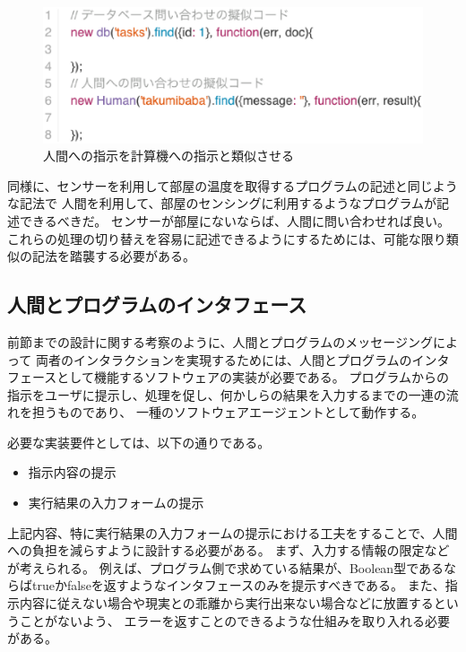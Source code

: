 \begin{figure}[htbp]
  \begin{center}
  \includegraphics[width=.9\linewidth]{images/design_integrated_style.js.eps}
  \end{center}
  \caption{人間への指示を計算機への指示と類似させる}
  \label{fig:design_integrated_style}
\end{figure}

同様に、センサーを利用して部屋の温度を取得するプログラムの記述と同じような記法で
人間を利用して、部屋のセンシングに利用するようなプログラムが記述できるべきだ。
センサーが部屋にないならば、人間に問い合わせれば良い。
これらの処理の切り替えを容易に記述できるようにするためには、可能な限り類似の記法を踏襲する必要がある。

\subsection{人間とプログラムのインタフェース}\label{ux4ebaux9593ux3068ux30d7ux30edux30b0ux30e9ux30e0ux306eux30a4ux30f3ux30bfux30d5ux30a7ux30fcux30b9}

前節までの設計に関する考察のように、人間とプログラムのメッセージングによって
両者のインタラクションを実現するためには、人間とプログラムのインタフェースとして機能するソフトウェアの実装が必要である。
プログラムからの指示をユーザに提示し、処理を促し、何かしらの結果を入力するまでの一連の流れを担うものであり、
一種のソフトウェアエージェントとして動作する。

必要な実装要件としては、以下の通りである。

\begin{itemize}
\itemsep1pt\parskip0pt
\item
  指示内容の提示
\item
  実行結果の入力フォームの提示
\end{itemize}

上記内容、特に実行結果の入力フォームの提示における工夫をすることで、人間への負担を減らすように設計する必要がある。
まず、入力する情報の限定などが考えられる。
例えば、プログラム側で求めている結果が、Boolean型であるならばtrueかfalseを返すようなインタフェースのみを提示すべきである。
また、指示内容に従えない場合や現実との乖離から実行出来ない場合などに放置するということがないよう、
エラーを返すことのできるような仕組みを取り入れる必要がある。

